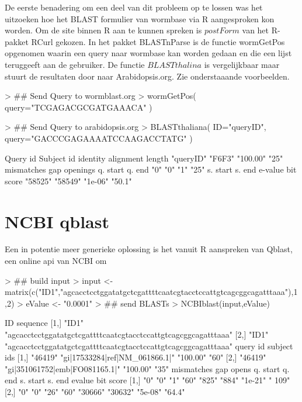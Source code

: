 \documentclass[a4paper]{article}
\begin{document}
De eerste benadering om een deel van dit probleem op te lossen was het uitzoeken hoe het BLAST formulier van wormbase\cite{Wormbase} via R aangesproken kon worden. Om de site binnen R aan te kunnen spreken is $postForm$ van het R-pakket RCurl\cite{RCurl} gekozen. In het pakket BLASTnParse is de functie wormGetPos opgenomen waarin een query naar wormbase kan worden gedaan en die een lijst teruggeeft aan de gebruiker. De functie $BLASTthalina$ is vergelijkbaar maar stuurt de resultaten door naar Arabidopsis.org\cite{Arab}. Zie onderstaaande voorbeelden.

\begin{Schunk}
\begin{Sinput}
> ## Send Query to wormblast.org
> wormGetPos( query="TCGAGACGCGATGAAACA" )
\end{Sinput}
\begin{Sinput}
> ## Send Query to arabidopsis.org
> BLASTthaliana( ID="queryID", query="GACCCGAGAAAATCCAAGACCTATG" )
\end{Sinput}
\begin{Soutput}
        Query id       Subject id         identity alignment length 
       "queryID"           "F6F3"         "100.00"             "25" 
      mismatches     gap openings         q. start           q. end 
             "0"              "0"              "1"             "25" 
        s. start           s. end          e-value        bit score 
         "58525"          "58549"          "1e-06"           "50.1" 
\end{Soutput}
\end{Schunk}

\section*{NCBI qblast}
Een in potentie meer generieke oplossing is het vanuit R aanspreken van Qblast\cite{qblast}, een online api van NCBI om

\begin{Schunk}
\begin{Sinput}
> ## build input
> input <- matrix(c("ID1","agcacctcctggatatgctcgattttcaatcgtacctccattgtcagcggcagatttaaa"),1,2)
> eValue <- "0.0001"
> ## send BLASTs
> NCBIblast(input,eValue)
\end{Sinput}
\begin{Soutput}
     ID    sequence                                                      
[1,] "ID1" "agcacctcctggatatgctcgattttcaatcgtacctccattgtcagcggcagatttaaa"
[2,] "ID1" "agcacctcctggatatgctcgattttcaatcgtacctccattgtcagcggcagatttaaa"
     query id subject ids                    % identity alignment length
[1,] "46419"  "gi|17533284|ref|NM_061866.1|" "100.00"   "60"            
[2,] "46419"  "gi|351061752|emb|FO081165.1|" "100.00"   "35"            
     mismatches gap opens q. start q. end s. start s. end  evalue  bit score
[1,] "0"        "0"       "1"      "60"   "825"    "884"   "1e-21" " 109"   
[2,] "0"        "0"       "26"     "60"   "30666"  "30632" "5e-08" "64.4"   
\end{Soutput}
\end{Schunk}
\end{document}
